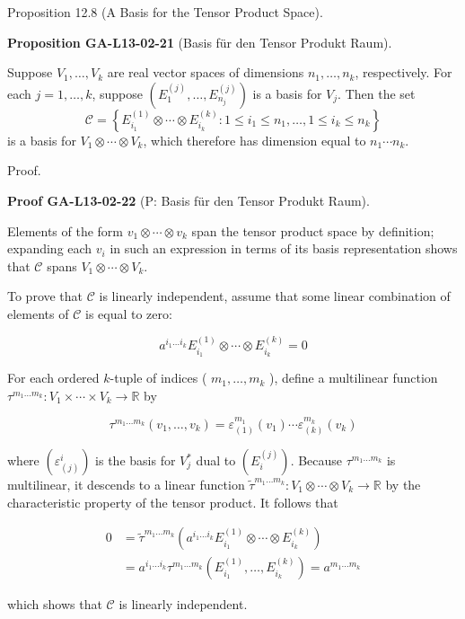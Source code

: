 \documentclass[10pt, letterpaper]{article}
\newcommand{\CustomHeading}[3]{%
  \par\medskip\noindent%
  \textbf{#1 #2} \textnormal{(#3)}.\enskip%
}
\newenvironment{PROP}[2]{\begin{unitbox}\CustomHeading{Proposition}{#1}{#2}}{\end{unitbox}}
\newenvironment{PROOF}[2]{\begin{unitbox}\CustomHeading{Proof}{#1}{#2}}{\end{unitbox}}
\begin{document}
Proposition 12.8 (A Basis for the Tensor Product Space). 


\begin{PROP}{GA-L13-02-21}{Basis für den Tensor Produkt Raum}
Suppose $V_{1}, \ldots, V_{k}$ are real vector spaces of dimensions $n_{1}, \ldots, n_{k}$, respectively. For each $j=1, \ldots, k$, suppose $\left(E_{1}^{(j)}, \ldots, E_{n_{j}}^{(j)}\right)$ is a basis for $V_{j}$. Then the set
$$
\mathcal{C}=\left\{E_{i_{1}}^{(1)} \otimes \cdots \otimes E_{i_{k}}^{(k)}: 1 \leq i_{1} \leq n_{1}, \ldots, 1 \leq i_{k} \leq n_{k}\right\}
$$
is a basis for $V_{1} \otimes \cdots \otimes V_{k}$, which therefore has dimension equal to $n_{1} \cdots n_{k}$.
\end{PROP}



Proof. 


\begin{PROOF}{GA-L13-02-22}{P: Basis für den Tensor Produkt Raum}
Elements of the form $v_{1} \otimes \cdots \otimes v_{k}$ span the tensor product space by definition; expanding each $v_{i}$ in such an expression in terms of its basis representation shows that $\mathcal{C}$ spans $V_{1} \otimes \cdots \otimes V_{k}$.

To prove that $\mathcal{C}$ is linearly independent, assume that some linear combination of elements of $\mathscr{C}$ is equal to zero:

$$
a^{i_{1} \ldots i_{k}} E_{i_{1}}^{(1)} \otimes \cdots \otimes E_{i_{k}}^{(k)}=0
$$

For each ordered $k$-tuple of indices ( $m_{1}, \ldots, m_{k}$ ), define a multilinear function $\tau^{m_{1} \ldots m_{k}}: V_{1} \times \cdots \times V_{k} \rightarrow \mathbb{R}$ by

$$
\tau^{m_{1} \ldots m_{k}}\left(v_{1}, \ldots, v_{k}\right)=\varepsilon_{(1)}^{m_{1}}\left(v_{1}\right) \cdots \varepsilon_{(k)}^{m_{k}}\left(v_{k}\right)
$$

where $\left(\varepsilon_{(j)}^{i}\right)$ is the basis for $V_{j}^{*}$ dual to $\left(E_{i}^{(j)}\right)$. Because $\tau^{m_{1} \ldots m_{k}}$ is multilinear, it descends to a linear function $\widetilde{\tau}^{m_{1} \ldots m_{k}}: V_{1} \otimes \cdots \otimes V_{k} \rightarrow \mathbb{R}$ by the characteristic property of the tensor product. It follows that

$$
\begin{aligned}
0 & =\tilde{\tau}^{m_{1} \ldots m_{k}}\left(a^{i_{1} \ldots i_{k}} E_{i_{1}}^{(1)} \otimes \cdots \otimes E_{i_{k}}^{(k)}\right) \\
& =a^{i_{1} \ldots i_{k}} \tau^{m_{1} \ldots m_{k}}\left(E_{i_{1}}^{(1)}, \ldots, E_{i_{k}}^{(k)}\right)=a^{m_{1} \ldots m_{k}}
\end{aligned}
$$

which shows that $\mathscr{C}$ is linearly independent.
\end{PROOF}
\end{document}
